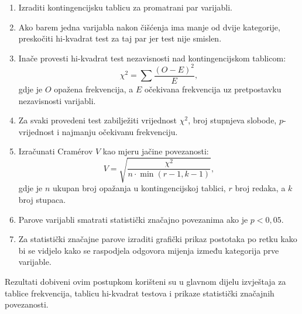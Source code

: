 \begin{enumerate}[label=\textbf{Korak \arabic*:}, leftmargin=*]
  \item Izraditi kontingencijsku tablicu za promatrani par varijabli.
  \item Ako barem jedna varijabla nakon čišćenja ima manje od dvije kategorije, preskočiti hi-kvadrat test za taj par jer test nije smislen.
  \item Inače provesti hi-kvadrat test nezavisnosti nad kontingencijskom tablicom:
  \[
    \chi^2 = \sum \frac{(O - E)^2}{E},
  \]
  gdje je $O$ opažena frekvencija, a $E$ očekivana frekvencija uz pretpostavku nezavisnosti varijabli.
  \item Za svaki provedeni test zabilježiti vrijednost $\chi^2$, broj stupnjeva slobode, $p$-vrijednost i najmanju očekivanu frekvenciju.
  \item Izračunati Cramérov $V$ kao mjeru jačine povezanosti:
  \[
    V = \sqrt{\frac{\chi^2}{n \cdot \min(r - 1, k - 1)}},
  \]
  gdje je $n$ ukupan broj opažanja u kontingencijskoj tablici, $r$ broj redaka, a $k$ broj stupaca.
  \item Parove varijabli smatrati statistički značajno povezanima ako je $p < 0{,}05$.
  \item Za statistički značajne parove izraditi grafički prikaz postotaka po retku kako bi se vidjelo kako se raspodjela odgovora mijenja između kategorija prve varijable.
\end{enumerate}

Rezultati dobiveni ovim postupkom korišteni su u glavnom dijelu izvještaja za tablice frekvencija, tablicu hi-kvadrat testova i prikaze statistički značajnih povezanosti.
